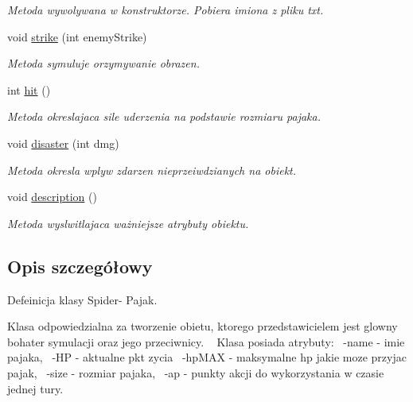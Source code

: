 \begin{DoxyCompactItemize}
\begin{DoxyCompactList}\small\item\em Metoda wywolywana w konstruktorze. Pobiera imiona z pliku txt. \end{DoxyCompactList}\item 
void \hyperlink{class_spider_a898f035a96dd91d148f7db34dbad5603}{strike} (int enemy\+Strike)
\begin{DoxyCompactList}\small\item\em Metoda symuluje orzymywanie obrazen. \end{DoxyCompactList}\item 
int \hyperlink{class_spider_a227aee02949293d7732045c13c440f3c}{hit} ()\hypertarget{class_spider_a227aee02949293d7732045c13c440f3c}{}\label{class_spider_a227aee02949293d7732045c13c440f3c}

\begin{DoxyCompactList}\small\item\em Metoda okreslajaca sile uderzenia na podstawie rozmiaru pajaka. \end{DoxyCompactList}\item 
void \hyperlink{class_spider_a528ee5426258ae04bd81498373524f2d}{disaster} (int dmg)\hypertarget{class_spider_a528ee5426258ae04bd81498373524f2d}{}\label{class_spider_a528ee5426258ae04bd81498373524f2d}

\begin{DoxyCompactList}\small\item\em Metoda okresla wplyw zdarzen nieprzeiwdzianych na obiekt. \end{DoxyCompactList}\item 
void \hyperlink{class_spider_a8ac56d49b3fc398424c978c0f45f778c}{description} ()\hypertarget{class_spider_a8ac56d49b3fc398424c978c0f45f778c}{}\label{class_spider_a8ac56d49b3fc398424c978c0f45f778c}

\begin{DoxyCompactList}\small\item\em Metoda wyslwitlajaca ważniejsze atrybuty obiektu. \end{DoxyCompactList}\end{DoxyCompactItemize}


\subsection{Opis szczegółowy}
Defeinicja klasy Spider-\/ Pajak. 

Klasa odpowiedzialna za tworzenie obietu, ktorego przedstawicielem jest glowny bohater symulacji oraz jego przeciwnicy. ~\newline
 Klasa posiada atrybuty\+:~\newline
-\/name -\/ imie pajaka,~\newline
-\/\+HP -\/ aktualne pkt zycia~\newline
-\/hp\+M\+AX -\/ maksymalne hp jakie moze przyjac pajak,~\newline
-\/size -\/ rozmiar pajaka,~\newline
-\/ap -\/ punkty akcji do wykorzystania w czasie jednej tury. 

